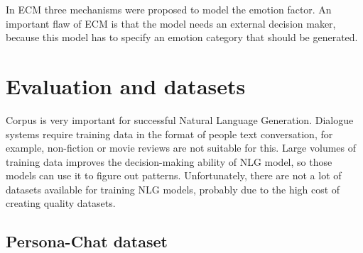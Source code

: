 In ECM three mechanisms were proposed to model the emotion factor. An important flaw of ECM is that the model needs an external decision maker, because this model has to specify an emotion category that should be generated.

\chapter{Evaluation and datasets} \label{eval_datasets_section}
Corpus is very important for successful Natural Language Generation. Dialogue systems require training data in the format of people text conversation, for example, non-fiction or movie reviews are not suitable for this. Large volumes of training data improves the decision-making ability of NLG model, so those models can use it to figure out patterns. Unfortunately, there are not a lot of datasets available for training NLG models, probably due to the high cost of creating quality datasets.  

\section{Persona-Chat dataset} \label{persona_chat_subsec}

